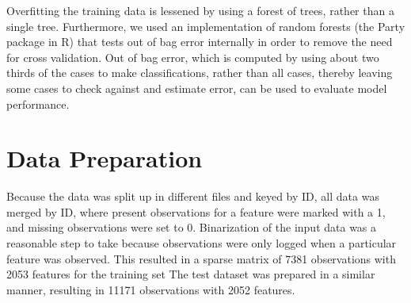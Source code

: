 \documentclass[11pt]{article} %
\begin{document}
Overfitting the training data is lessened by using a forest of trees, rather than a single tree. Furthermore, we used an implementation of random forests (the Party package in R) that tests out of bag error internally in order to remove the need for cross validation. Out of bag error, which is computed by using about two thirds of the cases to make classifications, rather than all cases, thereby leaving some cases to check against and estimate error, can be used to evaluate model performance.

\section*{Data Preparation}
Because the data was split up in different files and keyed by ID, all data was merged by ID, where present observations for a feature were marked with a 1, and missing observations were set to 0. Binarization of the input data was a reasonable step to take because observations were only logged when a particular feature was observed. This resulted in a sparse matrix of 7381 observations with 2053 features for the training set The test dataset was prepared in a similar manner, resulting in 11171 observations with 2052 features.
\end{document}
